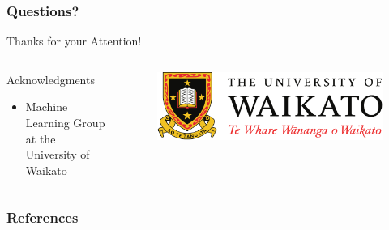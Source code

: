 \documentclass[handout]{beamer}
\begin{document}
\begin{frame}
\frametitle{Questions?}
\begin{center}\LARGE Thanks for your Attention!\\ \end{center}

\begin{columns}
\begin{column}{0.55\textwidth}
\begin{block}{Acknowledgments}
\begin{itemize}\tiny
	\item Machine Learning Group at the University of Waikato
	
\end{itemize}
\end{block}
\end{column}
\begin{column}{0.45\textwidth}
\vspace{1.5cm}

\begin{figure}[h!]
	\centering
	\includegraphics[scale=0.3]{pics/logo.pdf}
\end{figure}
\end{column}
\end{columns}


\end{frame}

\begin{frame}[allowframebreaks]\scriptsize
\frametitle{References}


%
\end{frame}  


\end{document}
